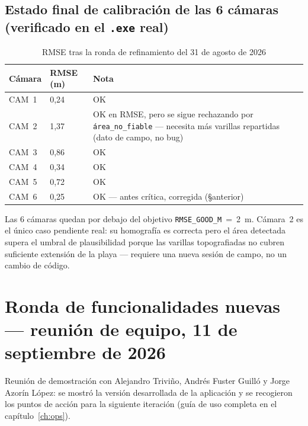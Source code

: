 \subsection{Estado final de calibración de las 6 cámaras (verificado en el \texttt{.exe} real)}

\begin{table}[H]
\centering
\caption{RMSE tras la ronda de refinamiento del 31 de agosto de 2026}
\begin{tabular}{C{2cm} C{2.5cm} L{7cm}}
\toprule
\textbf{Cámara} & \textbf{RMSE (m)} & \textbf{Nota} \\
\midrule
CAM~1 & 0,24 & \textcolor{OliveGreen}{OK} \\
CAM~2 & 1,37 & \textcolor{OliveGreen}{OK} en RMSE, pero se sigue rechazando por
  \texttt{área\_no\_fiable} — necesita más varillas repartidas (dato de campo, no bug) \\
CAM~3 & 0,86 & \textcolor{OliveGreen}{OK} \\
CAM~4 & 0,34 & \textcolor{OliveGreen}{OK} \\
CAM~5 & 0,72 & \textcolor{OliveGreen}{OK} \\
CAM~6 & 0,25 & \textcolor{OliveGreen}{OK} --- antes crítica, corregida (\S anterior) \\
\bottomrule
\end{tabular}
\end{table}

Las 6 cámaras quedan por debajo del objetivo \texttt{RMSE\_GOOD\_M}~=~2~m. Cámara~2 es el único
caso pendiente real: su homografía es correcta pero el área detectada supera el umbral de
plausibilidad porque las varillas topografiadas no cubren suficiente extensión de la playa —
requiere una nueva sesión de campo, no un cambio de código.

\section{Ronda de funcionalidades nuevas --- reunión de equipo, 11 de septiembre de 2026}
\label{sec:reunion-septiembre11}

Reunión de demostración con Alejandro Triviño, Andrés Fuster Guilló y Jorge Azorín López: se
mostró la versión desarrollada de la aplicación y se recogieron los puntos de acción para la
siguiente iteración (guía de uso completa en el capítulo~\ref{ch:ops}).

